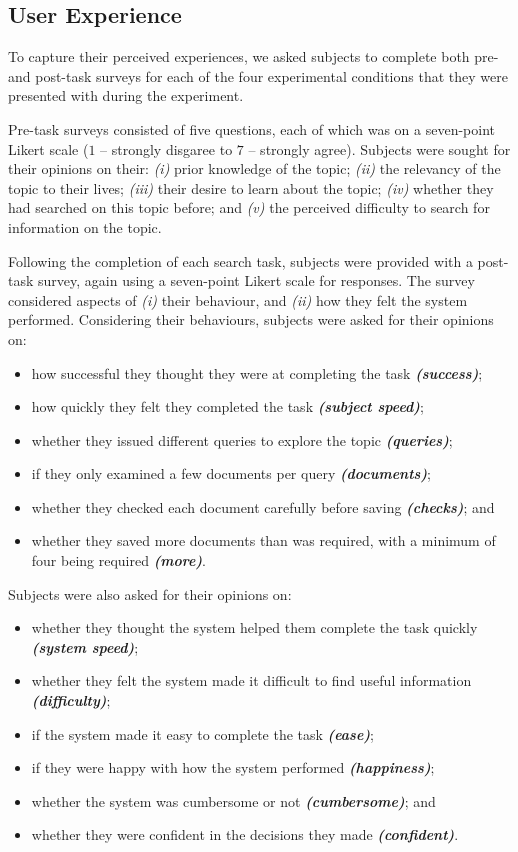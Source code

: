 \subsection{User Experience}\label{sec:method:experience}
To capture their perceived experiences, we asked subjects to complete both pre- and post-task surveys for each of the four experimental conditions that they were presented with during the experiment.

Pre-task surveys consisted of five questions, each of which was on a seven-point Likert scale ($1$ -- strongly disgaree to $7$ -- strongly agree). Subjects were sought for their opinions on their: \emph{(i)} prior knowledge of the topic; \emph{(ii)} the relevancy of the topic to their lives; \emph{(iii)} their desire to learn about the topic; \emph{(iv)} whether they had searched on this topic before; and \emph{(v)} the perceived difficulty to search for information on the topic.

Following the completion of each search task, subjects were provided with a post-task survey, again using a seven-point Likert scale for responses. The survey considered aspects of \emph{(i)} their behaviour, and \emph{(ii)} how they felt the system performed. Considering their behaviours, subjects were asked for their opinions on:

\begin{itemize}
\item how successful they thought they were at completing the task \emph{\textbf{(success)}}; 
\item how quickly they felt they completed the task \emph{\textbf{(subject speed)}}; 
\item whether they issued different queries to explore the topic \emph{\textbf{(queries)}}; 
\item if they only examined a few documents per query \emph{\textbf{(documents)}}; 
\item whether they checked each document carefully before saving \emph{\textbf{(checks)}}; and 
\item whether they saved more documents than was required, with a minimum of four being required \emph{\textbf{(more)}}. 
\end{itemize}
Subjects were also asked for their opinions on: 
\begin{itemize}
\item whether they thought the system helped them complete the task quickly \emph{\textbf{(system speed)}}; 
\item whether they felt the system made it difficult to find useful information \emph{\textbf{(difficulty)}}; 
\item if the system made it easy to complete the task \emph{\textbf{(ease)}}; 
\item if they were happy with how the system performed \emph{\textbf{(happiness)}}; 
\item whether the system was cumbersome or not \emph{\textbf{(cumbersome)}}; and 
\item whether they were confident in the decisions they made \emph{\textbf{(confident)}}. 
\end{itemize}

